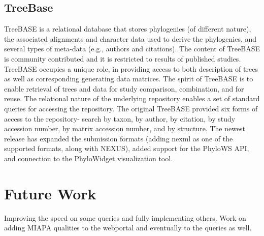 \documentclass[10pt]{article}
\begin{document}
\subsection{TreeBase}

TreeBASE \cite{treebase} is a relational database that stores phylogenies (of
different nature), the associated alignments and character data used to derive
the phylogenies, and several types of meta-data (e.g., authors and citations).
The content of TreeBASE is community contributed and it is restricted to
results of published studies. TreeBASE occupies a unique role, in providing
access to both description of trees as well as corresponding generating data
matrices.  The spirit of TreeBASE is to enable retrieval of trees and data for
study comparison, combination, and for reuse. The relational nature of the
underlying repository enables a set of standard queries for accessing the
repository. The original TreeBASE provided six forms of access to the
repository- search by taxon, by author, by citation, by study accession number,
by matrix accession number, and by structure.  The newest release has expanded
the submission formats (adding nexml as one of the supported formats, along
with NEXUS), added support for the PhyloWS API, and connection to the
PhyloWidget visualization tool.

\section{Future Work}

Improving the speed on some queries and fully implementing others.  Work on
adding MIAPA qualities to the webportal and eventually to the queries as well.


  
\end{document}
